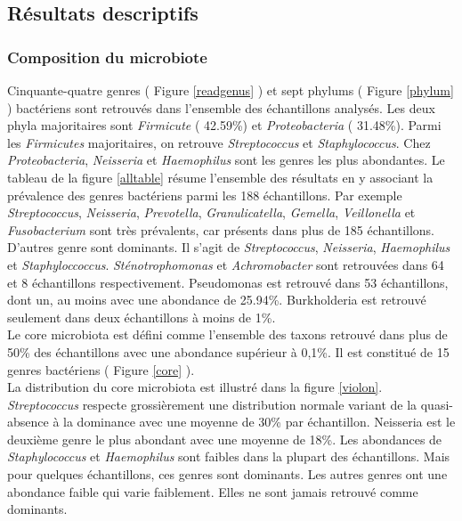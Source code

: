 \documentclass[12pt,a4paper]{article}
\begin{document}
\subsection{Résultats descriptifs}
\subsubsection{Composition du microbiote}
Cinquante-quatre genres ( Figure \ref{readgenus} ) et sept phylums ( Figure \ref{phylum} ) bactériens sont retrouvés dans l'ensemble des échantillons analysés. 
Les deux phyla majoritaires sont \textit{Firmicute} ( 42.59\%) et \textit{Proteobacteria} ( 31.48\%). Parmi les \textit{Firmicutes} majoritaires, on retrouve \textit{Streptococcus} et \textit{Staphylococcus}. Chez \textit{Proteobacteria}, \textit{Neisseria} et \textit{Haemophilus} sont les genres les plus abondantes.
Le tableau de la figure \ref{alltable} résume l'ensemble des résultats en y associant la prévalence des genres bactériens parmi les 188 échantillons.
Par exemple \textit{Streptococcus}, \textit{Neisseria}, \textit{Prevotella}, \textit{Granulicatella}, \textit{Gemella}, \textit{Veillonella} et \textit{Fusobacterium} sont très prévalents, car présents dans plus de 185 échantillons.
D’autres genre sont dominants. Il s’agit de \textit{Streptococcus}, \textit{Neisseria}, \textit{Haemophilus} et \textit{Staphyloccoccus}. \textit{Sténotrophomonas} et \textit{Achromobacter} sont retrouvées dans 64 et 8 échantillons respectivement. Pseudomonas est retrouvé dans 53 échantillons, dont un, au moins avec une abondance de 25.94\%. Burkholderia est retrouvé seulement dans deux échantillons à moins de 1\%.\\
Le core microbiota est défini comme l'ensemble des taxons retrouvé dans plus de 50\% des échantillons avec une abondance supérieur à 0,1\%. Il est constitué de 15 genres bactériens ( Figure \ref{core} ).\\
La distribution du core microbiota est illustré dans la figure \ref{violon}.
\textit{Streptococcus} respecte grossièrement une distribution normale variant de la quasi-absence à la dominance avec une moyenne de 30\% par échantillon. Neisseria est le deuxième genre le plus abondant avec une moyenne de 18\%.
Les abondances de \textit{Staphylococcus} et \textit{Haemophilus} sont faibles dans la plupart des échantillons. Mais pour quelques échantillons, ces genres sont dominants. Les autres genres ont une abondance faible qui varie faiblement. Elles ne sont jamais retrouvé comme dominants.
\end{document}
